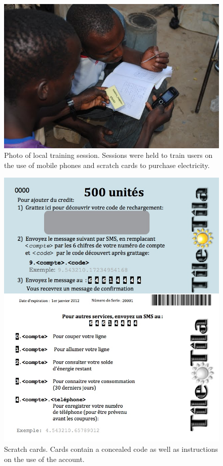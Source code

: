 \documentclass{sig-alternate}
\begin{document}
\begin{figure}[]
\begin{center}
\includegraphics[width=\columnwidth]{figures/training.jpg}
\end{center}
\caption{Photo of local training session.  Sessions were held to train users on the use
of mobile phones and scratch cards to purchase electricity.}
\label{training}
\end{figure}


\begin{figure}[]
\begin{center}
\includegraphics[width=\columnwidth]{figures/scratchCards.jpg}
\end{center}
\caption{Scratch cards.  Cards contain a concealed code as well as instructions on the
use of the account.}
\label{scratchCards}
\end{figure}
\end{document}
